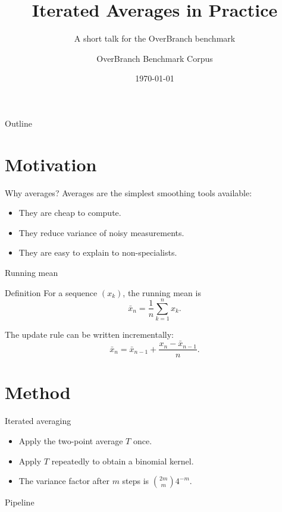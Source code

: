 \documentclass[aspectratio=169]{beamer}
\title{Iterated Averages in Practice}
\subtitle{A short talk for the OverBranch benchmark}
\author{OverBranch Benchmark Corpus}
\institute{Compiler Benchmark Suite}
\date{\today}
\begin{document}
\frame{\titlepage}

\begin{frame}{Outline}
  \tableofcontents
\end{frame}

\section{Motivation}

\begin{frame}{Why averages?}
  Averages are the simplest smoothing tools available:
  \begin{itemize}[<+->]
    \item They are cheap to compute.
    \item They reduce variance of noisy measurements.
    \item They are easy to explain to non-specialists.
  \end{itemize}
\end{frame}

\begin{frame}{Running mean}
  \begin{block}{Definition}
    For a sequence $(x_k)$, the running mean is
    \[
      \bar{x}_n = \frac{1}{n}\sum_{k=1}^{n} x_k .
    \]
  \end{block}
  \vspace{0.5em}
  The update rule can be written incrementally:
  \[
    \bar{x}_{n} = \bar{x}_{n-1} + \frac{x_n - \bar{x}_{n-1}}{n}.
  \]
\end{frame}

\section{Method}

\begin{frame}{Iterated averaging}
  \begin{itemize}
    \item<1-> Apply the two-point average $T$ once.
    \item<2-> Apply $T$ repeatedly to obtain a binomial kernel.
    \item<3-> The variance factor after $m$ steps is $\binom{2m}{m}4^{-m}$.
  \end{itemize}
\end{frame}

\begin{frame}{Pipeline}
  \centering
\end{frame}
\end{document}
